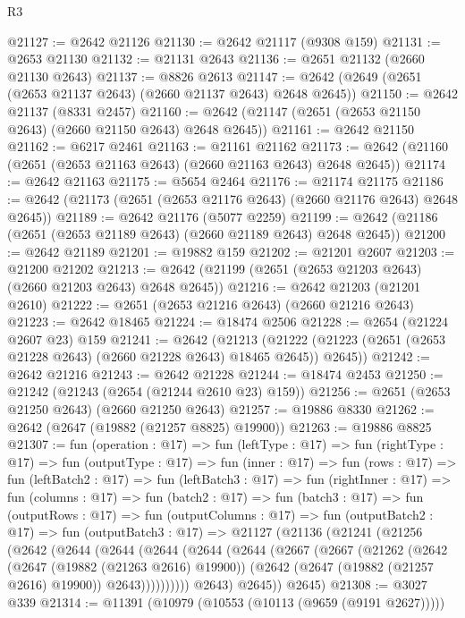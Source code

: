 \begin{lexlean}{R3}
\begin{coremodule}
@21127 := @2642 @21126
@21130 := @2642 @21117 (@9308 @159)
@21131 := @2653 @21130
@21132 := @21131 @2643
@21136 := @2651 @21132 (@2660 @21130 @2643)
@21137 := @8826 @2613
@21147 := @2642 (@2649 (@2651 (@2653 @21137 @2643) (@2660 @21137 @2643) @2648 @2645))
@21150 := @2642 @21137 (@8331 @2457)
@21160 := @2642 (@21147 (@2651 (@2653 @21150 @2643) (@2660 @21150 @2643) @2648 @2645))
@21161 := @2642 @21150
@21162 := @6217 @2461
@21163 := @21161 @21162
@21173 := @2642 (@21160 (@2651 (@2653 @21163 @2643) (@2660 @21163 @2643) @2648 @2645))
@21174 := @2642 @21163
@21175 := @5654 @2464
@21176 := @21174 @21175
@21186 := @2642 (@21173 (@2651 (@2653 @21176 @2643) (@2660 @21176 @2643) @2648 @2645))
@21189 := @2642 @21176 (@5077 @2259)
@21199 := @2642 (@21186 (@2651 (@2653 @21189 @2643) (@2660 @21189 @2643) @2648 @2645))
@21200 := @2642 @21189
@21201 := @19882 @159
@21202 := @21201 @2607
@21203 := @21200 @21202
@21213 := @2642 (@21199 (@2651 (@2653 @21203 @2643) (@2660 @21203 @2643) @2648 @2645))
@21216 := @2642 @21203 (@21201 @2610)
@21222 := @2651 (@2653 @21216 @2643) (@2660 @21216 @2643)
@21223 := @2642 @18465
@21224 := @18474 @2506
@21228 := @2654 (@21224 @2607 @23) @159
@21241 := @2642
    (@21213 (@21222 (@21223 (@2651 (@2653 @21228 @2643) (@2660 @21228 @2643) @18465 @2645)) @2645))
@21242 := @2642 @21216
@21243 := @2642 @21228
@21244 := @18474 @2453
@21250 := @21242 (@21243 (@2654 (@21244 @2610 @23) @159))
@21256 := @2651 (@2653 @21250 @2643) (@2660 @21250 @2643)
@21257 := @19886 @8330
@21262 := @2642 (@2647 (@19882 (@21257 @8825) @19900))
@21263 := @19886 @8825
@21307 := fun (operation : @17) =>
  fun (leftType : @17) =>
  fun (rightType : @17) =>
  fun (outputType : @17) =>
  fun (inner : @17) =>
  fun (rows : @17) =>
  fun (leftBatch2 : @17) =>
  fun (leftBatch3 : @17) =>
  fun (rightInner : @17) =>
  fun (columns : @17) =>
  fun (batch2 : @17) =>
  fun (batch3 : @17) =>
  fun (outputRows : @17) =>
  fun (outputColumns : @17) =>
  fun (outputBatch2 : @17) =>
  fun (outputBatch3 : @17) =>
  @21127
    (@21136
      (@21241
        (@21256
          (@2642
            (@2644
              (@2644
                (@2644
                  (@2644
                    (@2644
                      (@2667
                        (@2667
                          (@21262
                            (@2642
                              (@2647 (@19882 (@21263 @2616) @19900))
                              (@2642 (@2647 (@19882 (@21257 @2616) @19900)) @2643))))))))))
            @2643)
          @2645))
      @2645)
@21308 := @3027 @339
@21314 := @11391 (@10979 (@10553 (@10113 (@9659 (@9191 @2627)))))

\end{coremodule}
\end{lexlean}
